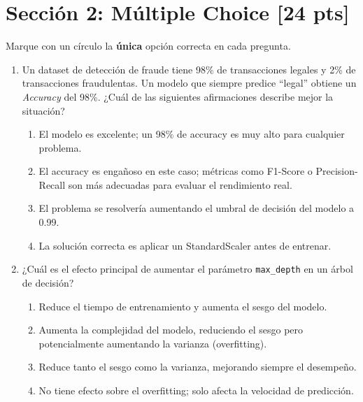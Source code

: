 \documentclass[11pt,a4paper]{article}
\newcommand{\puntaje}[1]{\textbf{[#1 pts]}}
\begin{document}
\vspace{0.5cm}

\section*{Secci\'on 2: M\'ultiple Choice \puntaje{24}}

\noindent Marque con un c\'irculo la \textbf{\'unica} opci\'on correcta en cada pregunta.

\vspace{0.3cm}

\begin{enumerate}[label=\textbf{\arabic*.}, leftmargin=*, itemsep=20pt]

\item Un dataset de detecci\'on de fraude tiene 98\% de transacciones legales y 2\% de transacciones fraudulentas. Un modelo que siempre predice ``legal'' obtiene un \textit{Accuracy} del 98\%. ¿Cu\'al de las siguientes afirmaciones describe mejor la situaci\'on?

\begin{enumerate}[label=\alph*)]
  \item El modelo es excelente; un 98\% de accuracy es muy alto para cualquier problema.
  \item El accuracy es enga\~noso en este caso; m\'etricas como F1-Score o Precision-Recall son m\'as adecuadas para evaluar el rendimiento real.
  \item El problema se resolver\'ia aumentando el umbral de decisi\'on del modelo a 0.99.
  \item La soluci\'on correcta es aplicar un StandardScaler antes de entrenar.
\end{enumerate}

\item ¿Cu\'al es el efecto principal de aumentar el par\'ametro \texttt{max\_depth} en un \'arbol de decisi\'on?

\begin{enumerate}[label=\alph*)]
  \item Reduce el tiempo de entrenamiento y aumenta el sesgo del modelo.
  \item Aumenta la complejidad del modelo, reduciendo el sesgo pero potencialmente aumentando la varianza (overfitting).
  \item Reduce tanto el sesgo como la varianza, mejorando siempre el desempe\~no.
  \item No tiene efecto sobre el overfitting; solo afecta la velocidad de predicci\'on.
\end{enumerate}


\end{enumerate}
\end{document}

